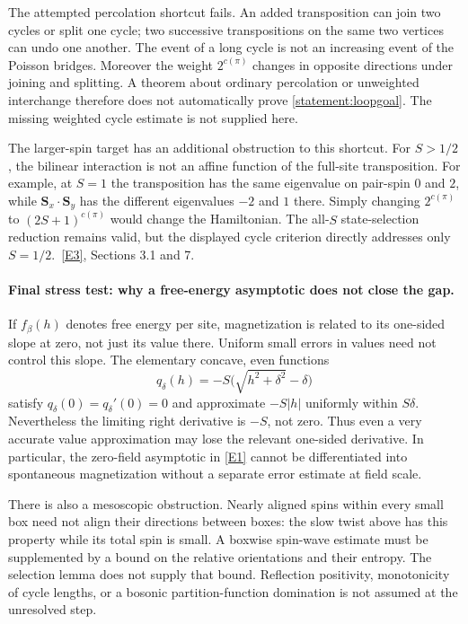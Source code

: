 \documentclass[11pt]{article}
\newcommand{\eref}[2]{\hyperlink{extra:#1:#2}{[E#2]}}
\begin{document}
	The attempted percolation shortcut fails. An added transposition can
	join two cycles or split one cycle; two successive transpositions on
	the same two vertices can undo one another. The event of a long cycle
	is not an increasing event of the Poisson bridges. Moreover the weight
	$2^{c(\pi)}$ changes in opposite directions under joining and splitting.
	A theorem about ordinary percolation or unweighted interchange therefore
	does not automatically prove \eqref{statement:loopgoal}. The missing weighted
	cycle estimate is not supplied here.
	
	The larger-spin target has an additional obstruction to this shortcut.
	For $S>1/2$, the bilinear interaction is not an affine function of the
	full-site transposition. For example, at $S=1$ the transposition has
	the same eigenvalue on pair-spin $0$ and $2$, while
	$\mathbf S_x\cdot\mathbf S_y$ has the different eigenvalues $-2$ and
	$1$ there. Simply changing $2^{c(\pi)}$ to $(2S+1)^{c(\pi)}$ would
	change the Hamiltonian. The all-$S$ state-selection reduction remains
	valid, but the displayed cycle criterion directly addresses only
	$S=1/2$.\ \eref{statement}{3}, Sections 3.1 and 7.
	
	\paragraph{Final stress test: why a free-energy asymptotic does not close the gap.}
	If $f_\beta(h)$ denotes free energy per site, magnetization is related
	to its one-sided slope at zero, not just its value there. Uniform
	small errors in values need not control this slope. The elementary
	concave, even functions
	\[
	q_\delta(h)=-S\bigl(\sqrt{h^2+\delta^2}-\delta\bigr)
	\]
	satisfy $q_\delta(0)=q_\delta'(0)=0$ and approximate $-S|h|$ uniformly
	within $S\delta$. Nevertheless the limiting right derivative is
	$-S$, not zero. Thus even a very accurate value approximation may
	lose the relevant one-sided derivative. In particular, the zero-field
	asymptotic in \eref{statement}{1} cannot be differentiated into spontaneous
	magnetization without a separate error estimate at field scale.
	
	There is also a mesoscopic obstruction. Nearly aligned spins within
	every small box need not align their directions between boxes: the
	slow twist above has this property while its total spin is small.
	A boxwise spin-wave estimate must be supplemented by a bound on the
	relative orientations and their entropy. The selection lemma does
	not supply that bound. Reflection positivity, monotonicity of cycle
	lengths, or a bosonic partition-function domination is not assumed
	at the unresolved step.
	
\end{document}
